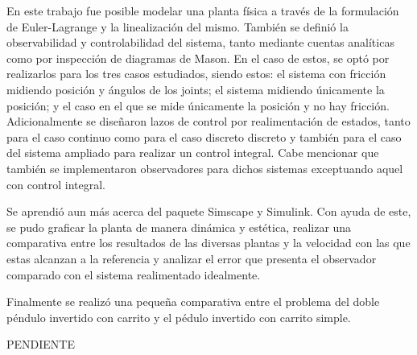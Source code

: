%
%

En este trabajo fue posible modelar una planta física a través de la formulación de Euler-Lagrange y la linealización del mismo. También se definió la observabilidad y controlabilidad del sistema, tanto mediante cuentas analíticas como por inspección de diagramas de Mason. En el caso de estos, se optó por realizarlos para los tres casos estudiados, siendo estos: el sistema con fricción midiendo posición y ángulos de los joints; el sistema midiendo únicamente la posición; y el caso en el que se mide únicamente la posición y no hay fricción.
Adicionalmente se diseñaron lazos de control por realimentación de estados, tanto para el caso continuo como para el caso discreto discreto y también para el caso del sistema ampliado para realizar un control integral. Cabe mencionar que también se implementaron observadores para dichos sistemas exceptuando aquel con control integral.


Se aprendió aun más acerca del paquete Simscape y Simulink. Con ayuda de este, se pudo graficar la planta de manera dinámica y estética, realizar una comparativa entre los resultados de las diversas plantas y la velocidad con las que estas alcanzan a la referencia y analizar el error que presenta el observador comparado con el sistema realimentado idealmente.

Finalmente se realizó una pequeña comparativa entre el problema del doble péndulo invertido con carrito y el pédulo invertido con carrito simple.

PENDIENTE
%